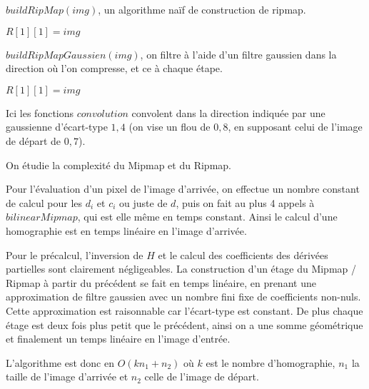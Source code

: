 \medbreak
\medbreak
\begin{algorithm}[H]
\caption{$buildRipMap(img)$, un algorithme naïf de construction de ripmap.}
\label{buildRipmap1}
$R[1][1] = img$\;

\end{algorithm}
\medbreak
\medbreak
\medbreak
\medbreak
\begin{algorithm}[H]
\caption{$buildRipMapGaussien(img)$, on filtre à l'aide d'un filtre gaussien dans la direction où l'on compresse, et ce à chaque étape.}
\label{buildRipmap2}
$R[1][1] = img$\;

\end{algorithm}
\medbreak
\medbreak
Ici les fonctions $convolution$ convolent dans la direction indiquée par une gaussienne d'écart-type $1,4$ \cite{morel2011sift} (on vise un flou de $0,8$, en supposant celui de l'image de départ de $0,7$).


On étudie la complexité du Mipmap et du Ripmap.

Pour l'évaluation d'un pixel de l'image d'arrivée, on effectue un nombre constant de calcul pour les $d_i$ et $c_i$ ou juste de $d$, puis on fait au plus 4 appels à $bilinearMipmap$, qui est elle même en temps constant. Ainsi le calcul d'une homographie est en temps linéaire en l'image d'arrivée.

Pour le précalcul, l'inversion de $H$ et le calcul des coefficients des dérivées partielles sont clairement négligeables. La construction d'un étage du Mipmap / Ripmap à partir du précédent se fait en temps linéaire, en prenant une approximation de filtre gaussien avec un nombre fini fixe de coefficients non-nuls. Cette approximation est raisonnable car l'écart-type est constant. De plus chaque étage est deux fois plus petit que le précédent, ainsi on a une somme géométrique et finalement un temps linéaire en l'image d'entrée.

L'algorithme est donc en $O(k n_1 + n_2)$ où $k$ est le nombre d'homographie, $n_1$ la taille de l'image d'arrivée et $n_2$ celle de l'image de départ.



